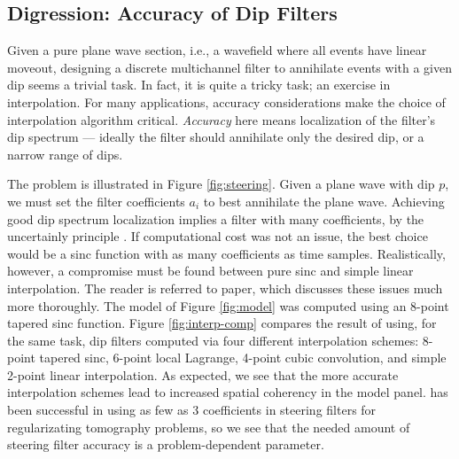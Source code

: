 

\subsection{Digression: Accuracy of Dip Filters}

Given a pure plane wave section, i.e., a wavefield where all events have linear 
moveout, designing a discrete multichannel filter to annihilate events with a given
dip seems a trivial task.  In fact, it is quite a tricky task; an exercise in
interpolation.  For many applications, accuracy considerations make the choice of 
interpolation algorithm critical.  {\em Accuracy} here means localization of the
filter's dip spectrum --- ideally the filter should annihilate only the desired
dip, or a narrow range of dips.  



The problem is illustrated in Figure \ref{fig:steering}.  Given a plane wave with
dip $p$, we must set the filter coefficients $a_i$ to best annihilate the plane wave.
Achieving good dip spectrum localization implies a filter with many coefficients, by the 
uncertainly principle \cite[]{bracewell}.  If computational cost was not an issue, the best
choice would be a sinc function with as many coefficients as time samples.
Realistically, however, a compromise must be found between pure sinc and 
simple linear interpolation.  The reader is referred to \cite[]{Fomel.sep.105.sergey2} 
paper, which discusses these issues much more
thoroughly.  The model of Figure \ref{fig:model} was computed using an 8-point
tapered sinc function.  Figure \ref{fig:interp-comp} compares
the result of using, for the same task,  dip filters computed via four different
interpolation schemes: 8-point tapered sinc, 6-point local Lagrange, 4-point cubic convolution,
and simple 2-point linear interpolation.  As expected, we see that the more 
accurate interpolation schemes lead to increased spatial coherency in the model panel.
\cite{Clapp.sep.103.bob3} has been successful in using as few as 3 coefficients in steering
filters for regularizating tomography problems, so we see that the needed amount 
of steering filter accuracy is a problem-dependent parameter.

